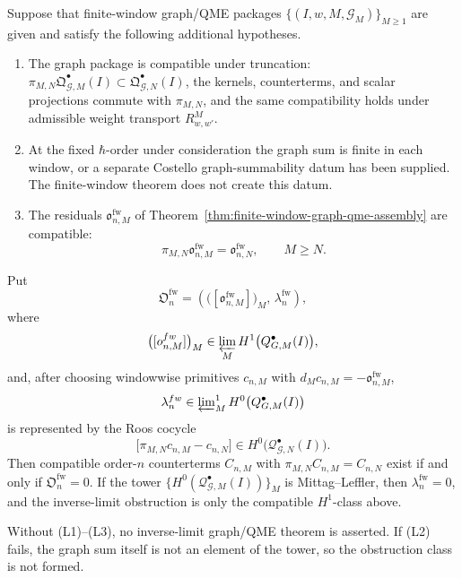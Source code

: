 \begin{prop}\label{prop:finite-window-qme-limit-condition}
  Suppose that finite-window graph/QME packages
  \(\{(I,w,M,\mathcal G_M)\}_{M\geq1}\) are given and satisfy the
  following additional hypotheses.
  \begin{enumerate}[label=(L\arabic*)]
    \item The graph package is compatible under truncation:
    \(\pi_{M,N}\mathfrak Q^\bullet_{\mathcal G,M}(I)\subset
    \mathfrak Q^\bullet_{\mathcal G,N}(I)\), the kernels, counterterms,
    and scalar projections commute with \(\pi_{M,N}\), and the same
    compatibility holds under admissible weight transport \(R^M_{w,w'}\).
    \item At the fixed \(\hbar\)-order under consideration the graph sum is
    finite in each window, or a separate Costello graph-summability datum
    has been supplied.  The finite-window theorem does not create this
    datum.
    \item The residuals
    \(\mathfrak o^{\mathrm{fw}}_{n,M}\) of
    Theorem~\ref{thm:finite-window-graph-qme-assembly} are compatible:
    \[
      \pi_{M,N}\mathfrak o^{\mathrm{fw}}_{n,M}
        =
      \mathfrak o^{\mathrm{fw}}_{n,N},
      \qquad M\geq N.
    \]
  \end{enumerate}
  Put
  \[
    \mathfrak O^{\mathrm{fw}}_n
      =
    \left(
      \bigl([\mathfrak o^{\mathrm{fw}}_{n,M}]\bigr)_M,\,
      \lambda^{\mathrm{fw}}_n
    \right),
  \]
  where
  \[
    \bigl([\mathfrak o^{\mathrm{fw}}_{n,M}]\bigr)_M
      \in
    \varprojlim_M
    H^1\bigl(\mathcal Q^\bullet_{\mathcal G,M}(I)\bigr),
  \]
  and, after choosing windowwise primitives
  \(c_{n,M}\) with
  \(d_M c_{n,M}=-\mathfrak o^{\mathrm{fw}}_{n,M}\),
  \[
    \lambda^{\mathrm{fw}}_n\in
    \varprojlim\nolimits^1_M
    H^0\bigl(\mathcal Q^\bullet_{\mathcal G,M}(I)\bigr)
  \]
  is represented by the Roos cocycle
  \[
    \bigl[\pi_{M,N}c_{n,M}-c_{n,N}\bigr]\in
    H^0\bigl(\mathcal Q^\bullet_{\mathcal G,N}(I)\bigr).
  \]
  Then compatible order-\(n\) counterterms
  \(C_{n,M}\) with
  \(\pi_{M,N}C_{n,M}=C_{n,N}\) exist if and only if
  \(\mathfrak O^{\mathrm{fw}}_n=0\).  If the tower
  \(\{H^0(\mathcal Q^\bullet_{\mathcal G,M}(I))\}_M\) is
  Mittag--Leffler, then \(\lambda^{\mathrm{fw}}_n=0\), and the inverse-limit
  obstruction is only the compatible \(H^1\)-class above.

  Without (L1)--(L3), no inverse-limit graph/QME theorem is asserted.  If
  (L2) fails, the graph sum itself is not an element of the tower, so the
  obstruction class is not formed.
\end{prop}

